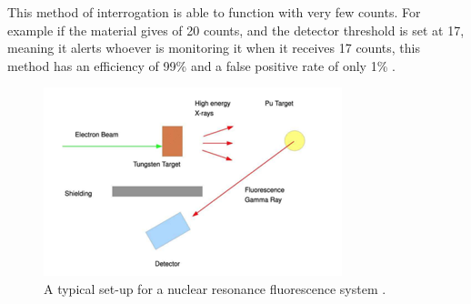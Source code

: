 \documentclass{report}
\begin{document}
This method of interrogation is able to function with very few counts. For example if the material gives of 20 counts, and the detector threshold is set at 17, meaning it alerts whoever is monitoring it when it receives 17 counts, this method has an efficiency of 99\% and a false positive rate of only 1\% \cite{Chichester2009}. 

\begin{figure}[h]
 \centering
 \includegraphics[trim = 0cm 0cm 0cm 0cm, clip,scale=0.7]{./figures/NRF_setup.png}
   \caption{A typical set-up for  a nuclear resonance fluorescence system \cite{Morse2014a}.}
     \label{fig:NRF_setup}
\end{figure}
\end{document}
